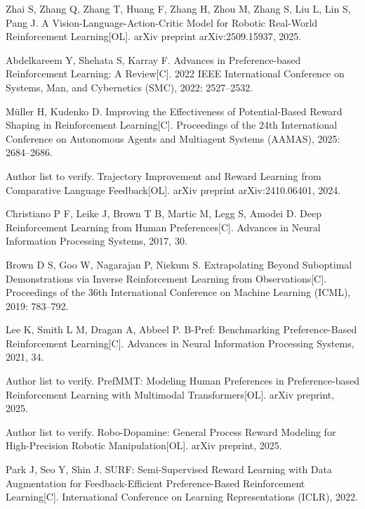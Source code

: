 

Zhai S, Zhang Q, Zhang T, Huang F, Zhang H, Zhou M, Zhang S, Liu L, Lin S, Pang J.
A Vision-Language-Action-Critic Model for Robotic Real-World Reinforcement Learning[OL].
arXiv preprint arXiv:2509.15937, 2025.

Abdelkareem Y, Shehata S, Karray F.
Advances in Preference-based Reinforcement Learning: A Review[C].
2022 IEEE International Conference on Systems, Man, and Cybernetics (SMC), 2022: 2527--2532.

Müller H, Kudenko D.
Improving the Effectiveness of Potential-Based Reward Shaping in Reinforcement Learning[C].
Proceedings of the 24th International Conference on Autonomous Agents and Multiagent Systems (AAMAS), 2025: 2684--2686.

Author list to verify.
Trajectory Improvement and Reward Learning from Comparative Language Feedback[OL].
arXiv preprint arXiv:2410.06401, 2024.

Christiano P F, Leike J, Brown T B, Martic M, Legg S, Amodei D.
Deep Reinforcement Learning from Human Preferences[C].
Advances in Neural Information Processing Systems, 2017, 30.

Brown D S, Goo W, Nagarajan P, Niekum S.
Extrapolating Beyond Suboptimal Demonstrations via Inverse Reinforcement Learning from Observations[C].
Proceedings of the 36th International Conference on Machine Learning (ICML), 2019: 783--792.

Lee K, Smith L M, Dragan A, Abbeel P.
B-Pref: Benchmarking Preference-Based Reinforcement Learning[C].
Advances in Neural Information Processing Systems, 2021, 34.

Author list to verify.
PrefMMT: Modeling Human Preferences in Preference-based Reinforcement Learning with Multimodal Transformers[OL].
arXiv preprint, 2025.

Author list to verify.
Robo-Dopamine: General Process Reward Modeling for High-Precision Robotic Manipulation[OL].
arXiv preprint, 2025.

Park J, Seo Y, Shin J.
SURF: Semi-Supervised Reward Learning with Data Augmentation for Feedback-Efficient Preference-Based Reinforcement Learning[C].
International Conference on Learning Representations (ICLR), 2022.


